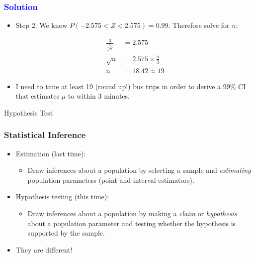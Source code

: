 \documentclass[12pt]{beamer}
\begin{document}
\begin{frame}
	\frametitle{\textcolor{blue}{Solution}}
	
	\begin{itemize}[label={\color{blue}$\blacktriangleright$}]
		\item Step 2: We know $P(-2.575 < Z < 2.575) = 0.99$. Therefore solve for $n$:
		
		\begin{align*}
			\frac{3}{\frac{5}{\sqrt{n}}} &= 2.575 \\[10pt]
			\sqrt{n} &= 2.575 \times \frac{5}{3} \\[10pt]
			n &= 18.42 \approx 19
		\end{align*}
		
		
		\item I need to time at least 19 (round up!) bus trips in order to derive a 99\% CI that estimates $\mu$ to within 3 minutes.
	\end{itemize}
	
\end{frame}
\begin{frame}
	\vspace{1cm}
	\centering
	{\color{blue}\large Hypothesis Test}
\end{frame}
\begin{frame}
	\frametitle{Statistical Inference}
	
	\begin{itemize}[label={\color{blue}$\blacktriangleright$}]
		\item Estimation (last time):
		\begin{itemize}[label={\color{blue}$\blacktriangleright$}]
			\item Draw inferences about a population by selecting a sample and \emph{estimating} population parameters (point and interval estimators).
		\end{itemize}
		
		\item Hypothesis testing (this time):
		\begin{itemize}[label={\color{blue}$\blacktriangleright$}]
			\item Draw inferences about a population by making a \emph{claim} or \emph{hypothesis} about a population parameter and testing whether the hypothesis is supported by the sample.
		\end{itemize}
		\item They are different!
	\end{itemize}
	
\end{frame}
\end{document}

